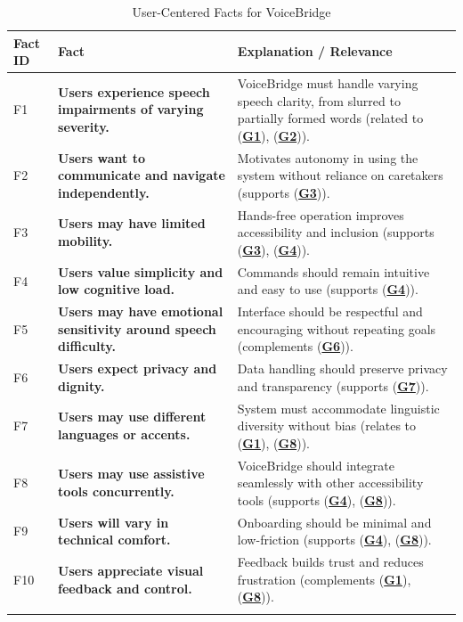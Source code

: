 \documentclass[11pt]{article}
\begin{document}
\begin{table}[H]
\centering
\setcounter{table}{3}  

\begin{tabularx}{\textwidth}{p{1cm}p{6cm}X}
\toprule {\textbf{Fact ID}} & {\textbf{Fact}} & {\textbf{Explanation / Relevance}}\\
\midrule
F1 & \textbf{Users experience speech impairments of varying severity.} & VoiceBridge must handle varying speech clarity, from slurred to partially formed words (related to (\textbf{\hyperref[tab:project-goals]{G1}}), (\textbf{\hyperref[tab:project-goals]{G2}})). \\ \hline
F2 & \textbf{Users want to communicate and navigate independently.} & Motivates autonomy in using the system without reliance on caretakers (supports (\textbf{\hyperref[tab:project-goals]{G3}})). \\ \hline
F3 & \textbf{Users may have limited mobility.} & Hands-free operation improves accessibility and inclusion (supports (\textbf{\hyperref[tab:project-goals]{G3}}), (\textbf{\hyperref[tab:project-goals]{G4}})). \\ \hline
F4 & \textbf{Users value simplicity and low cognitive load.} & Commands should remain intuitive and easy to use (supports (\textbf{\hyperref[tab:project-goals]{G4}})). \\ \hline
F5 & \textbf{Users may have emotional sensitivity around speech difficulty.} & Interface should be respectful and encouraging without repeating goals (complements (\textbf{\hyperref[tab:project-goals]{G6}})). \\ \hline
F6 & \textbf{Users expect privacy and dignity.} & Data handling should preserve privacy and transparency (supports (\textbf{\hyperref[tab:project-goals]{G7}})). \\ \hline
F7 & \textbf{Users may use different languages or accents.} & System must accommodate linguistic diversity without bias (relates to (\textbf{\hyperref[tab:project-goals]{G1}}), (\textbf{\hyperref[tab:project-goals]{G8}})). \\ \hline
F8 & \textbf{Users may use assistive tools concurrently.} & VoiceBridge should integrate seamlessly with other accessibility tools (supports (\textbf{\hyperref[tab:project-goals]{G4}}), (\textbf{\hyperref[tab:project-goals]{G8}})). \\ \hline
F9 & \textbf{Users will vary in technical comfort.} & Onboarding should be minimal and low-friction (supports (\textbf{\hyperref[tab:project-goals]{G4}}), (\textbf{\hyperref[tab:project-goals]{G8}})). \\ \hline
F10 & \textbf{Users appreciate visual feedback and control.} & Feedback builds trust and reduces frustration (complements (\textbf{\hyperref[tab:project-goals]{G1}}), (\textbf{\hyperref[tab:project-goals]{G8}})). \\
\bottomrule
\caption{User-Centered Facts for VoiceBridge}
\label{tab:relevant-facts}
\end{tabularx}
\end{table}
\end{document}
